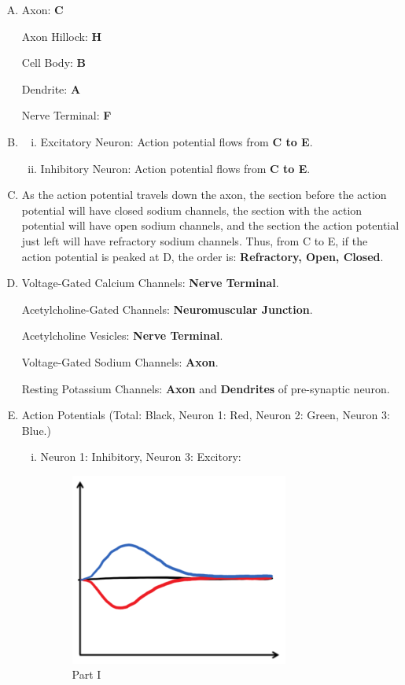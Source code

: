\documentclass{article}
\begin{document}
\begin{enumerate}[A.]
    \item Axon: \textbf{C}

        Axon Hillock: \textbf{H}

        Cell Body: \textbf{B}

        Dendrite: \textbf{A}

        Nerve Terminal: \textbf{F}

    \item 
        \begin{enumerate}[i.]
            \item Excitatory Neuron: Action potential flows from \textbf{C to E}.

            \item Inhibitory Neuron: Action potential flows from \textbf{C to E}.
        \end{enumerate} 

    \item As the action potential travels down the axon, the section before the
        action potential will have closed sodium channels, the section with the
        action potential will have open sodium channels, and the section the
        action potential just left will have refractory sodium channels. Thus,
        from C to E, if the action potential is peaked at D, the order is:
        \textbf{Refractory, Open, Closed}.

    \item Voltage-Gated Calcium Channels: \textbf{Nerve Terminal}.

        Acetylcholine-Gated Channels: \textbf{Neuromuscular Junction}.

        Acetylcholine Vesicles: \textbf{Nerve Terminal}.

        Voltage-Gated Sodium Channels: \textbf{Axon}.

        Resting Potassium Channels: \textbf{Axon} and \textbf{Dendrites} of
        pre-synaptic neuron.

    \item Action Potentials (Total: Black, Neuron 1: Red, Neuron 2: Green, Neuron 3: Blue.)
        \begin{enumerate}[i.]
            \item Neuron 1: Inhibitory, Neuron 3: Excitory:
                \begin{figure}[H]
                    \centering
                    \includegraphics[scale=1.00]{"Part I"}
                    \caption{Part I}
                \end{figure}


\end{enumerate}
\end{enumerate}
\end{document}
